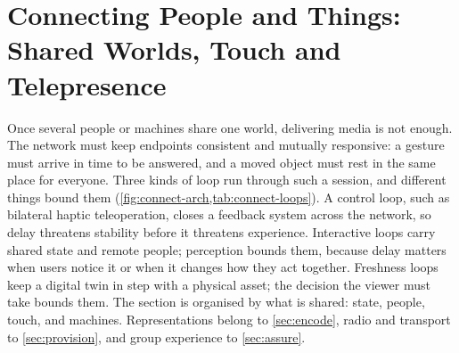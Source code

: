 \section{Connecting People and Things: Shared Worlds, Touch and Telepresence}\label{sec:connect}

Once several people or machines share one world, delivering media is not enough. The network must keep endpoints consistent and mutually responsive: a gesture must arrive in time to be answered, and a moved object must rest in the same place for everyone. Three kinds of loop run through such a session, and different things bound them (\cref{fig:connect-arch,tab:connect-loops}). A control loop, such as bilateral haptic teleoperation, closes a feedback system across the network, so delay threatens stability before it threatens experience. Interactive loops carry shared state and remote people; perception bounds them, because delay matters when users notice it or when it changes how they act together. Freshness loops keep a digital twin in step with a physical asset; the decision the viewer must take bounds them. The section is organised by what is shared: state, people, touch, and machines. Representations belong to \cref{sec:encode}, radio and transport to \cref{sec:provision}, and group experience to \cref{sec:assure}.

